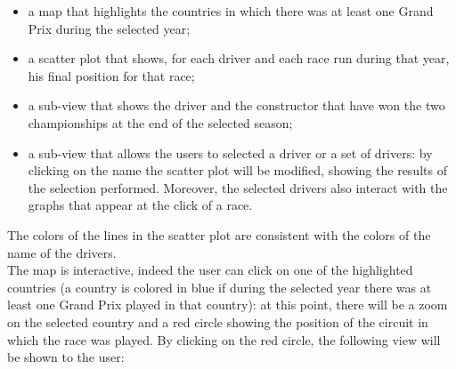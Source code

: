 \documentclass[11pt,twocolumn,letterpaper]{article}
\begin{document}
\begin{itemize}
	\item a map that highlights the countries in which there was at least one Grand Prix during the selected year;
	\item a scatter plot that shows, for each driver and each race run during that year, his final position for that race;
	\item a sub-view that shows the driver and the constructor that have won the two championships at the end of the selected season;
	\item a sub-view that allows the users to selected a driver or a set of drivers: by clicking on the name the scatter plot will be modified, showing the results of the selection performed. Moreover, the selected drivers also interact with the graphs that appear at the click of a race.
\end{itemize}

The colors of the lines in the scatter plot are consistent with the colors of the name of the drivers.\\ 
The map is interactive, indeed the user can click on one of the highlighted countries (a country is colored in blue if during the selected year there was at least one Grand Prix played in that country): at this point, there will be a zoom on the selected country and a red circle showing the position of the circuit in which the race was played. By clicking on the red circle, the following view will be shown to the user:
\end{document}
